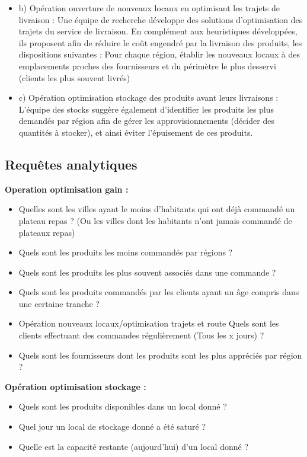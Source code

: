 \begin{itemize}
\begin{itemize}
\begin{itemize}
                \end{itemize}
        \end{itemize}
    \\
    \item b) Opération ouverture de nouveaux locaux en optimisant les trajets de livraison : 
Une équipe de recherche développe des solutions d’optimisation des trajets du service de livraison. En complément aux heuristiques développées, ils proposent afin de réduire le coût engendré par la livraison des produits, les dispositions suivantes : 
Pour chaque région, établir les nouveaux locaux à des emplacements proches des fournisseurs et du périmètre le plus desservi (clients les plus souvent livrés)
    \\
    \item c) Opération optimisation stockage des produits avant leurs livraisons : 
L’équipe des stocks suggère également d’identifier les produits les plus demandés par région afin de gérer les approvisionnements (décider des quantités à stocker), et ainsi éviter l’épuisement de ces produits.
\end{itemize}

\newpage 
\subsection{Requêtes analytiques} 
\textbf{Operation optimisation gain :}
\begin{itemize}
    \item Quelles sont les villes ayant le moins d’habitants qui ont déjà commandé un plateau repas ? (Ou les villes dont les habitants n’ont jamais commandé de plateaux repas)
    \item Quels sont les produits les moins commandés par régions ? 
    \item Quels sont les produits les plus souvent associés dans une commande ?
    \item Quels sont les produits commandés par les clients ayant un âge compris dans une certaine tranche ?
    \item Opération nouveaux locaux/optimisation trajets et route 
Quels sont les clients effectuant des commandes régulièrement (Tous les x jours) ?
    \item Quels sont les fournisseurs dont les produits sont les plus appréciés par région ?
\end{itemize}

\textbf{Opération optimisation stockage :}
\begin{itemize}
    \item Quels sont les produits disponibles dans un local donné ?
    \item Quel jour un local de stockage donné a été saturé ? \item Quelle est la capacité restante (aujourd’hui) d’un local donné ?
\end{itemize}


